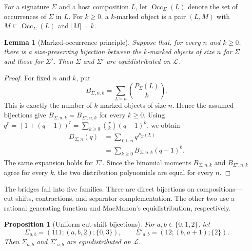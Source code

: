 \documentclass[12pt]{article}
\newtheorem{lem}[thm]{Lemma}
\newtheorem{prop}[thm]{Proposition}
\newcommand{\cL}{\mathcal L}
\begin{document}
For a signature $\Sigma$ and a host composition $L$, let
$\operatorname{Occ}_\Sigma(L)$ denote the set of occurrences of $\Sigma$ in
$L$.  For $k\ge0$, a $k$-marked object is a pair $(L,M)$ with
$M\subseteq\operatorname{Occ}_\Sigma(L)$ and $|M|=k$.

\begin{lem}[Marked-occurrence principle]
\label{lem:marked-occurrence}
Suppose that, for every $n$ and $k\ge0$, there is a size-preserving bijection
between the $k$-marked objects of size $n$ for $\Sigma$ and those for
$\Sigma'$.  Then $\Sigma$ and $\Sigma'$ are equidistributed on $\cL$.
\end{lem}

\begin{proof}
For fixed $n$ and $k$, put
\[
B_{\Sigma,n,k}
=
\sum_{L\models n}\binom{P_\Sigma(L)}{k}.
\]
This is exactly the number of $k$-marked objects of size $n$.  Hence the
assumed bijections give $B_{\Sigma,n,k}=B_{\Sigma',n,k}$ for every $k\ge0$.
Using
$q^r=(1+(q-1))^r=\sum_{k\ge0}\binom{r}{k}(q-1)^k$, we obtain
\[
\begin{aligned}
D_{\Sigma,n}(q)
&=
\sum_{L\models n}q^{P_\Sigma(L)}\\
&=
\sum_{k\ge0}
B_{\Sigma,n,k}(q-1)^k.
\end{aligned}
\]
The same expansion holds for $\Sigma'$.  Since the binomial moments
$B_{\Sigma,n,k}$ and $B_{\Sigma',n,k}$ agree for every $k$, the two
distribution polynomials are equal for every $n$.
\end{proof}

The bridges fall into five families.  Three are direct bijections on
compositions---cut shifts, contractions, and separator complementation.  The
other two use a rational generating function and MacMahon's equidistribution,
respectively.

\begin{prop}[Uniform cut-shift bijections]
\label{prop:uniform-cut-shift}
For $a,b\in\{0,1,2\}$, let
\[
\Sigma_{a,b}
=
(111;(a,b,2);\{0,3\}),
\qquad
\Sigma'_{a,b}
=
(12;(b,a+1);\{2\}).
\]
Then $\Sigma_{a,b}$ and $\Sigma'_{a,b}$ are equidistributed on $\cL$.
\end{prop}
\end{document}
